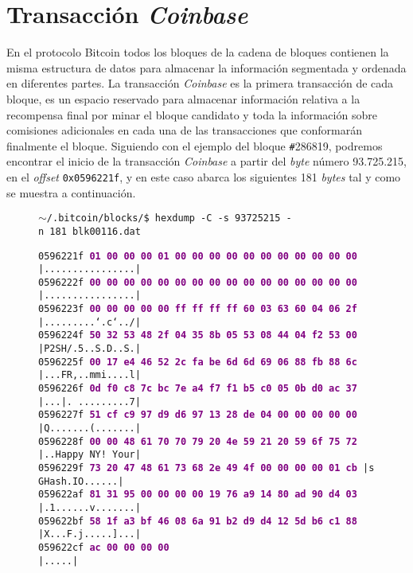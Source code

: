 \documentclass{article}
\begin{document}
\section{Transacción \textit{Coinbase}}
    En el protocolo Bitcoin todos los bloques de la cadena de bloques contienen la misma estructura de datos para almacenar la información segmentada y ordenada en diferentes partes. La transacción \textit{Coinbase} es la primera transacción de cada bloque, es un espacio reservado para almacenar información relativa a la recompensa final por minar el bloque candidato y toda la información sobre comisiones adicionales en cada una de las transacciones que conformarán finalmente el bloque. Siguiendo con el ejemplo del bloque \texttt{\#}286819, podremos encontrar el inicio de la transacción \textit{Coinbase} a partir del \textit{byte} número 93.725.215, en el \textit{offset} \texttt{0x0596221f}, y en este caso abarca los siguientes 181 \textit{bytes} tal y como se muestra a continuación.
    \begin{figure}[H]
    \scriptsize{\texttt{$\sim$/.bitcoin/blocks/\$ hexdump\ -C\ -s\ 93725215\ -n\ 181\ blk00116.dat}}
        
        \scriptsize{
        \texttt{0596221f \textbf{\textcolor{purple}{01 00 00 00 01 00 00 00  00 00 00 00 00 00 00 00}} |................|} \\
        \texttt{0596222f \textbf{\textcolor{purple}{00 00 00 00 00 00 00 00  00 00 00 00 00 00 00 00}} |................|} \\
        \texttt{0596223f \textbf{\textcolor{purple}{00 00 00 00 00 ff ff ff  ff 60 03 63 60 04 06 2f}} |.........`.c`../|} \\
        \texttt{0596224f \textbf{\textcolor{purple}{50 32 53 48 2f 04 35 8b  05 53 08 44 04 f2 53 00}} |P2SH/.5..S.D..S.|} \\
        \texttt{0596225f \textbf{\textcolor{purple}{00 17 e4 46 52 2c fa be  6d 6d 69 06 88 fb 88 6c}} |...FR,..mmi....l|} \\
        \texttt{0596226f \textbf{\textcolor{purple}{0d f0 c8 7c bc 7e a4 f7  f1 b5 c0 05 0b d0 ac 37}} |...|.~.........7|} \\
        \texttt{0596227f \textbf{\textcolor{purple}{51 cf c9 97 d9 d6 97 13  28 de 04 00 00 00 00 00}} |Q.......(.......|} \\
        \texttt{0596228f \textbf{\textcolor{purple}{00 00 48 61 70 70 79 20  4e 59 21 20 59 6f 75 72}} |..Happy NY! Your|} \\
        \texttt{0596229f \textbf{\textcolor{purple}{73 20 47 48 61 73 68 2e  49 4f 00 00 00 00 01 cb}} |s GHash.IO......|} \\
        \texttt{059622af \textbf{\textcolor{purple}{81 31 95 00 00 00 00 19  76 a9 14 80 ad 90 d4 03}} |.1......v.......|} \\
        \texttt{059622bf \textbf{\textcolor{purple}{58 1f a3 bf 46 08 6a 91  b2 d9 d4 12 5d b6 c1 88}} |X...F.j.....]...|} \\
        \texttt{059622cf \textbf{\textcolor{purple}{ac 00 00 00 00 \ \ \ \ \ \ \ \ \ \ \ \ \ \ \ \ \ \ \ \ \ \ \ \ \ \ \ \ \ \ \ \ }} |.....|}}
    \end{figure}
\end{document}
